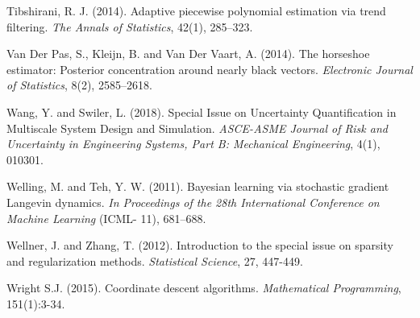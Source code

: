 \documentclass[12pt]{TD-CJS}
\begin{document}
\begin{thebibliography}{}
Tibshirani, R. J. (2014). Adaptive piecewise polynomial estimation via trend filtering. {\it The Annals of Statistics}, 42(1), 285--323.

Van Der Pas, S., Kleijn, B.  and  Van Der Vaart, A. (2014). The horseshoe estimator: Posterior concentration around nearly black vectors. {\it Electronic Journal of Statistics}, 8(2), 2585--2618.

Wang, Y. and  Swiler, L. (2018). Special Issue on Uncertainty Quantification in Multiscale System Design and Simulation.
{\it ASCE-ASME Journal of Risk and Uncertainty in Engineering Systems, Part B: Mechanical Engineering}, 4(1), 010301.

Welling, M. and  Teh, Y. W. (2011). Bayesian learning via stochastic gradient Langevin dynamics. {\it In Proceedings of the 28th International Conference on Machine Learning} (ICML- 11), 681--688.

 Wellner, J. and Zhang, T. (2012). 
Introduction to the special issue on sparsity and regularization methods. 
{\em Statistical Science}, 27, 447-449.

%

Wright S.J. (2015).  Coordinate descent algorithms. {\it Mathematical Programming},  151(1):3-34.
\end{thebibliography}
\end{document}
